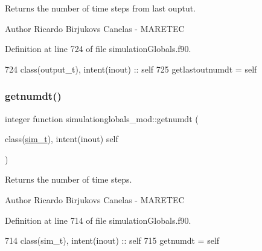Returns the number of time steps from last ouptut. 

\begin{DoxyAuthor}{Author}
Ricardo Birjukovs Canelas -\/ M\+A\+R\+E\+T\+EC 
\end{DoxyAuthor}


Definition at line 724 of file simulation\+Globals.\+f90.


\begin{DoxyCode}
724     \textcolor{keywordtype}{class}(output\_t), \textcolor{keywordtype}{intent(inout)} :: self
725     getlastoutnumdt = self%
\end{DoxyCode}
\mbox{\label{namespacesimulationglobals__mod_af313959d6cbfc4cb0ab330aa094511c5}} 
\subsubsection{\texorpdfstring{getnumdt()}{getnumdt()}}
{\footnotesize\ttfamily integer function simulationglobals\+\_\+mod\+::getnumdt (\begin{DoxyParamCaption}\item[{class(\mbox{\hyperlink{structsimulationglobals__mod_1_1sim__t}{sim\+\_\+t}}), intent(inout)}]{self }\end{DoxyParamCaption})\hspace{0.3cm}{\ttfamily [private]}}



Returns the number of time steps. 

\begin{DoxyAuthor}{Author}
Ricardo Birjukovs Canelas -\/ M\+A\+R\+E\+T\+EC 
\end{DoxyAuthor}


Definition at line 714 of file simulation\+Globals.\+f90.


\begin{DoxyCode}
714     \textcolor{keywordtype}{class}(sim\_t), \textcolor{keywordtype}{intent(inout)} :: self
715     getnumdt = self%
\end{DoxyCode}
\mbox{\label{namespacesimulationglobals__mod_a2b76dc3e6cbf1256253c54903df8393b}} 
